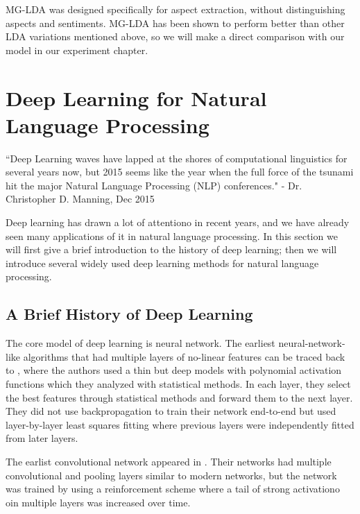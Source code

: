 MG-LDA was designed specifically for aspect extraction, without distinguishing aspects and sentiments. MG-LDA has been shown to perform better than other LDA variations mentioned above, so we will make a direct comparison with our model  in our experiment chapter.

\section{Deep Learning for Natural Language Processing}


\begin{displayquote}
 ``Deep Learning waves have lapped at the shores of computational linguistics for several years now, but 2015 seems like the year when the full force of the tsunami hit the major Natural Language Processing (NLP) conferences." - Dr. Christopher D. Manning, Dec 2015 
\end{displayquote}

Deep learning has drawn a lot of attentiono in recent years, and we have already seen many applications of it in natural language processing. In this section we will first give a brief introduction to the history of deep learning; then we will introduce several widely used deep learning methods for natural language processing. 

\subsection{A Brief History of Deep Learning}

The core model of deep learning is neural network. The earliest neural-network-like algorithms that had multiple layers of no-linear features can be traced back to \cite{ivakhnenko1965cybernetic}, where the authors used a thin but deep models with polynomial activation functions which they analyzed with statistical methods. In each layer, they select the best features through statistical methods and forward them to the next layer. They did not use backpropagation to train their network end-to-end but used layer-by-layer least squares fitting where previous layers were independently fitted from later layers.

The earlist convolutional network appeared in \cite{fukushima1979organization}. Their networks had multiple convolutional and pooling layers similar to modern networks, but the network was trained by using a reinforcement scheme where a tail of strong activationo oin multiple layers was increased over time.

